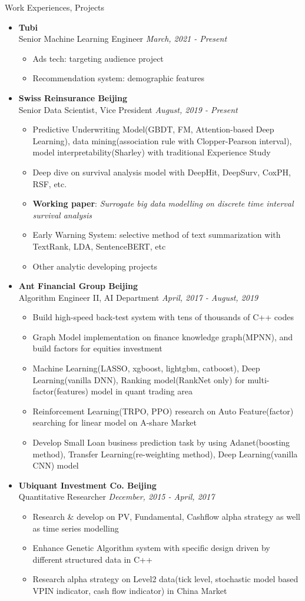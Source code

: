 \documentclass[a4paper,8pt,oneside]{scrartcl}
\newenvironment{ressection}[1]{
    \vspace{2pt}
    {\selectfont#1}
    \begin{itemize}
    \vspace{0pt}
}{
    \end{itemize}
}
\newcommand{\ressubitem}[1]{
    \vspace{0pt}
    \item #1
}
\newcommand{\resbigitem}[3]{
    \vspace{-5pt}
    \item
    \textbf{#1}\\
    #2
    \textit{#3}
}
\newenvironment{ressubsec}[3]{
    \resbigitem{#1}{#2}{#3}
    \vspace{-2pt}
    \begin{itemize}
}{
    \end{itemize}
}
\begin{document}
\begin{ressection}{Work Experiences, Projects}
  \begin{ressubsec}{Tubi}{Senior Machine Learning Engineer}{\hfill March, 2021 - Present}
	  \ressubitem{Ads tech: targeting audience project}
	  \ressubitem{Recommendation system: demographic features}
  \end{ressubsec}
  \begin{ressubsec}{Swiss Reinsurance \hfill Beijing}{Senior Data Scientist, Vice President}{\hfill August, 2019 - Present}
	  \ressubitem{Predictive Underwriting Model(GBDT, FM, Attention-based Deep Learning), data mining(association rule with Clopper-Pearson interval), model interpretability(Sharley) with traditional Experience Study}
	  \ressubitem{Deep dive on survival analysis model with DeepHit, DeepSurv, CoxPH, RSF, etc.}
	  \ressubitem{\textbf{Working paper}: \emph{Surrogate big data modelling on discrete time interval survival analysis}}
	  \ressubitem{Early Warning System: selective method of text summarization with TextRank, LDA, SentenceBERT, etc}
	  \ressubitem{Other analytic developing projects}
  \end{ressubsec}
  \begin{ressubsec}{Ant Financial Group \hfill Beijing}{Algorithm Engineer II, AI Department}{\hfill April, 2017 - August, 2019}
	  \ressubitem{Build high-speed back-test system with tens of thousands of C++ codes}
	  \ressubitem{Graph Model implementation on finance knowledge graph(MPNN), and build factors for equities investment}
	  \ressubitem{Machine Learning(LASSO, xgboost, lightgbm, catboost), Deep Learning(vanilla DNN), Ranking model(RankNet only) for multi-factor(features) model in quant trading area}
	  \ressubitem{Reinforcement Learning(TRPO, PPO) research on Auto Feature(factor) searching for linear model on A-share Market}
	  \ressubitem{Develop Small Loan business prediction task by using Adanet(boosting method), Transfer Learning(re-weighting method), Deep Learning(vanilla CNN) model}
  \end{ressubsec}
  \begin{ressubsec}{Ubiquant Investment Co. \hfill Beijing}{Quantitative Researcher}{\hfill December, 2015 - April, 2017}
	  \ressubitem{Research \& develop on PV, Fundamental, Cashflow alpha strategy as well as time series modelling}
	  \ressubitem{Enhance Genetic Algorithm system with specific design driven by different structured data in C++}
	  \ressubitem{Research alpha strategy on Level2 data(tick level, stochastic model based VPIN indicator, cash flow indicator) in China Market}

\end{ressubsec}
\end{ressection}
\end{document}
